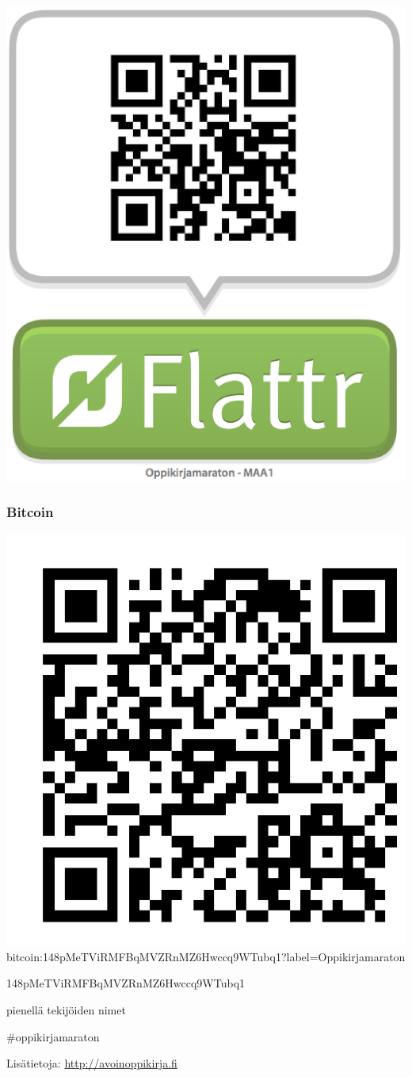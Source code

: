 \includegraphics[scale=0.2]{MAA1-Flattr.png}


\subsubsection*{Bitcoin}

\includegraphics[scale=0.2]{Oppikirjamaraton-Bitcoin.png}
bitcoin:148pMeTViRMFBqMVZRnMZ6Hwccq9WTubq1?label=Oppikirjamaraton

148pMeTViRMFBqMVZRnMZ6Hwccq9WTubq1


pienellä tekijöiden nimet

\#oppikirjamaraton


Lisätietoja: \url{http://avoinoppikirja.fi}